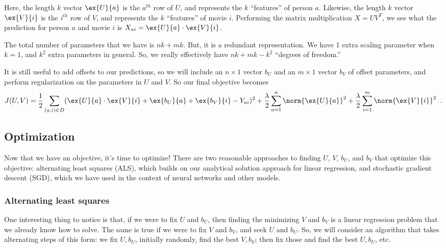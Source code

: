 Here, the length $k$ vector $\ex{U}{a}$ is the $a^{th}$ row of $U$,
and represents the $k$ ``features'' of person $a$. Likewise, the
length $k$ vector $\ex{V}{i}$ is the $i^{th}$ row of $V$, and 
represents the $k$ ``features'' of movie $i$. Performing the matrix
multiplication $X = UV^T$, we see what the prediction for person
$a$ and movie $i$ is $X_{ai} = \ex{U}{a} \cdot \ex{V}{i}$.

The total number of parameters that we have is $nk + mk$. But, it is
a redundant representation. We have 1 extra scaling parameter when
$k=1$, and $k^2$ extra parameters in general. So, we really effectively have
$nk + mk - k^2$ ``degrees of freedom.''

It is still useful to add offsets to our predictions, so we will
include an $n \times 1$ vector $b_U$ and an $m \times 1$ vector $b_V$
of offset parameters, and perform regularization on the parameters in
$U$ and $V$.  So our final objective becomes
\[
  J(U,V) = \frac{1}{2} \sum_{(a,i)\in D} 
           (\ex{U}{a} \cdot \ex{V}{i} + \ex{b_U}{a} + \ex{b_V}{i}
            - Y_{ai})^2
            + \frac{\lambda}{2} \sum_{a=1}^n \norm{\ex{U}{a}}^2
            + \frac{\lambda}{2} \sum_{i=1}^m \norm{\ex{V}{i}}^2
\;\;.\]

\subsection{Optimization}
Now that we have an objective, it's  time to optimize!  There are two
reasonable approaches to finding $U$, $V$, $b_U$, and $b_V$ that
optimize this objective:  alternating least squares (ALS), which builds on
our analytical solution approach for linear regression, and 
stochastic gradient descent (SGD), which we have used in the context
of neural networks and other models.

\subsubsection{Alternating least squares}
One interesting thing to notice is that, if we were to fix $U$ and
$b_U$, then finding the minimizing $V$ and $b_V$ is a linear
regression problem that we already know how to solve.  The same is
true if we were to fix $V$ and $b_V$, and seek $U$ and $b_U$.
So, we will consider an algorithm that takes alternating steps of this
form:  we fix $U, b_U$, initially randomly, find the best $V, b_V$;
then fix those and find the best $U, b_U$, etc.

